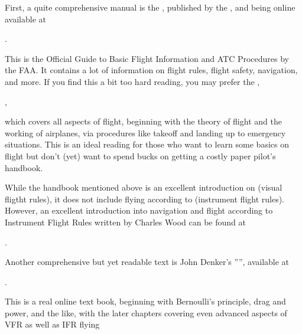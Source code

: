 First, a quite comprehensive manual is the ,
published by the , and being online available at
\medskip

.
\medskip

 \noindent
This is the Official Guide to Basic Flight Information and ATC Procedures by the FAA. It
contains a lot of information on flight rules, flight safety, navigation, and more. If
you find this a bit too hard reading, you may prefer the ,
\medskip

,
\medskip

 \noindent
which covers all aspects of flight, beginning with the theory of flight and the working
of airplanes, via procedures like takeoff and landing up to emergency situations. This is
an ideal reading for those who want to learn some basics on flight but don't (yet) want
to spend bucks on getting a costly paper pilot's handbook.

While the handbook mentioned above is an excellent introduction on  (visual
fligtht rules), it does not include flying according to  (instrument flight
rules). However, an excellent introduction into navigation and flight according to
Instrument Flight Rules written by Charles Wood can be found at

.

Another comprehensive but yet readable text is John Denker's
'''', available at
\medskip

.
\medskip

 \noindent
This is a real online text book, beginning with Bernoulli's principle, drag and power,
and the like, with the later chapters covering even advanced aspects of VFR as well as
IFR flying


